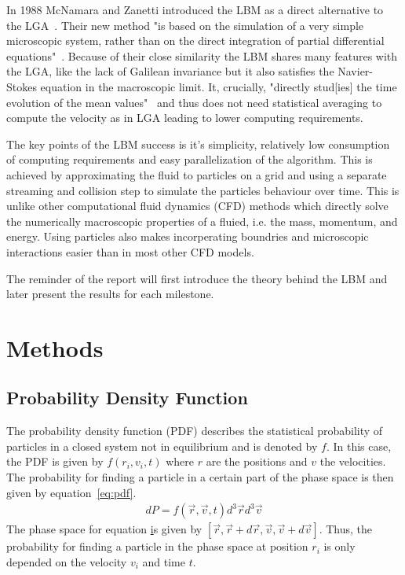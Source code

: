 \documentclass[a4paper,11pt]{article}
\begin{document}
In 1988 McNamara and Zanetti introduced the LBM as a direct alternative to the LGA~\cite{mcnamara1988boltzmann-method}.
Their new method "is based on the simulation of a very simple microscopic system, rather than on the direct integration of partial differential equations"~\cite{mcnamara1988boltzmann-method}.
Because of their close similarity the LBM shares many features with the LGA, like the lack of Galilean invariance but it also satisfies the Navier-Stokes equation in the macroscopic limit.
It, crucially, "directly stud[ies] the time evolution of the mean values"~\cite{mcnamara1988boltzmann-method} and thus does not need statistical averaging to compute the velocity as in LGA leading to lower computing requirements.

The key points of the LBM success is it's simplicity, relatively low consumption of computing requirements and easy parallelization of the algorithm.
This is achieved by approximating the fluid to particles on a grid and using a separate streaming and collision step to simulate the particles behaviour over time.
This is unlike other computational fluid dynamics (CFD) methods which directly solve the numerically macroscopic properties of a fluied, i.e. the mass, momentum, and energy.
Using particles also makes incorperating boundries and microscopic interactions easier than in most other CFD models.

The reminder of the report will first introduce the theory behind the LBM and later present the results for each milestone.

\section{Methods}
\subsection{Probability Density Function}
The probability density function (PDF) describes the statistical probability of particles in a closed system not in equilibrium and is denoted by $f$.
In this case, the PDF is given by $f(r_i,v_i,t)$ where $r$ are the positions and $v$ the velocities.
The probability for finding a particle in a certain part of the phase space is then given by equation~\ref{eq:pdf}.
\begin{equation}
  \label{eq:pdf}
  \begin{aligned}
    dP = f(\vec{r},\vec{v},t) d^{3}\vec{r} d^{3}\vec{v}
  \end{aligned}
\end{equation}
The phase space for equation \href{eq:pdf} is given by $[\vec{r}, \vec{r}+d\vec{r}, \vec{v}, \vec{v}+d\vec{v}]$.
Thus, the probability for finding a particle in the phase space at position $r_i$ is only depended on the velocity $v_i$ and time $t$.
\end{document}
